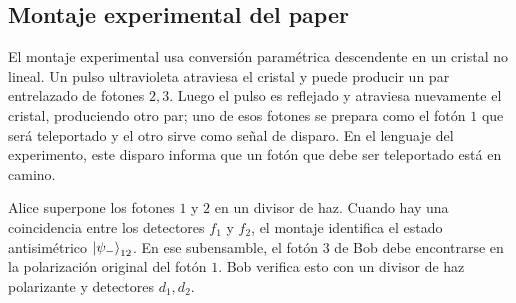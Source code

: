 \documentclass[12pt,a4paper]{article}
\theoremstyle{definition}
\theoremstyle{plain}
\theoremstyle{remark}
\begin{document}
\subsection{Montaje experimental del paper}

El montaje experimental usa conversión paramétrica descendente en un cristal no lineal. Un pulso ultravioleta atraviesa el cristal y puede producir un par entrelazado de fotones $2,3$. Luego el pulso es reflejado y atraviesa nuevamente el cristal, produciendo otro par; uno de esos fotones se prepara como el fotón $1$ que será teleportado y el otro sirve como señal de disparo. En el lenguaje del experimento, este disparo informa que un fotón que debe ser teleportado está en camino.

Alice superpone los fotones $1$ y $2$ en un divisor de haz. Cuando hay una coincidencia entre los detectores $f_1$ y $f_2$, el montaje identifica el estado antisimétrico $\ket{\psi_-}_{12}$. En ese subensamble, el fotón $3$ de Bob debe encontrarse en la polarización original del fotón $1$. Bob verifica esto con un divisor de haz polarizante y detectores $d_1,d_2$.
\end{document}
